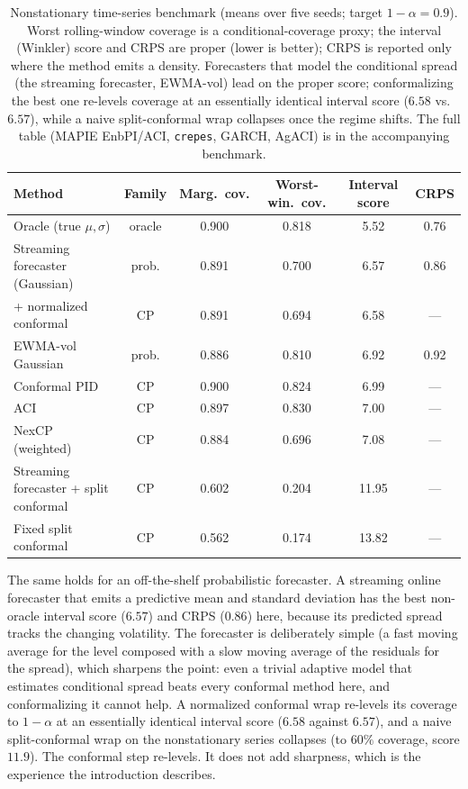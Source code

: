 \documentclass[10pt]{article} %
\theoremstyle{definition}
\begin{document}
\begin{table}[t]
\centering
\caption{Nonstationary time-series benchmark (means over five seeds; target
$1-\alpha=0.9$). Worst rolling-window coverage is a conditional-coverage proxy; the
interval (Winkler) score and CRPS are proper (lower is better); CRPS is reported only where
the method emits a density. Forecasters that model the conditional spread
(the streaming forecaster, EWMA-vol) lead on the proper score; conformalizing the best one re-levels
coverage at an essentially identical interval score ($6.58$ vs.\ $6.57$), while a naive
split-conformal wrap collapses once the regime shifts. The full table (MAPIE EnbPI/ACI,
\texttt{crepes}, GARCH, AgACI) is in the accompanying benchmark.}
\label{tab:ts}
\small
\begin{tabular}{lccccc}
\toprule
Method & Family & Marg.\ cov. & Worst-win.\ cov. & Interval score & CRPS \\
\midrule
Oracle (true $\mu,\sigma$)               & oracle & 0.900 & 0.818 & \phantom{0}5.52  & 0.76 \\
Streaming forecaster (Gaussian)          & prob.  & 0.891 & 0.700 & \phantom{0}6.57  & 0.86 \\
\quad + normalized conformal             & CP     & 0.891 & 0.694 & \phantom{0}6.58  & ---  \\
EWMA-vol Gaussian                        & prob.  & 0.886 & 0.810 & \phantom{0}6.92  & 0.92 \\
Conformal PID                            & CP     & 0.900 & 0.824 & \phantom{0}6.99  & ---  \\
ACI                                      & CP     & 0.897 & 0.830 & \phantom{0}7.00  & ---  \\
NexCP (weighted)                         & CP     & 0.884 & 0.696 & \phantom{0}7.08  & ---  \\
Streaming forecaster + split conformal   & CP     & 0.602 & 0.204 & 11.95            & ---  \\
Fixed split conformal                    & CP     & 0.562 & 0.174 & 13.82            & ---  \\
\bottomrule
\end{tabular}
\end{table}

The same holds for an off-the-shelf probabilistic forecaster. A streaming online
forecaster that emits a predictive mean and standard deviation \citep{cotton_timemachines}
has the best non-oracle interval score
($6.57$) and CRPS ($0.86$) here, because its predicted spread tracks the changing
volatility. The forecaster is deliberately simple (a fast moving average for the level
composed with a slow moving average of the
residuals for the spread), which sharpens the point: even a trivial adaptive model that
estimates conditional spread beats every conformal method here, and conformalizing it
cannot help. A normalized conformal
wrap re-levels its coverage to $1-\alpha$ at an essentially identical interval score
($6.58$ against $6.57$), and a naive split-conformal wrap on the nonstationary series
collapses (to $60\%$ coverage, score $11.9$). The conformal step re-levels. It does not
add sharpness, which is the experience the introduction describes.
\end{document}
